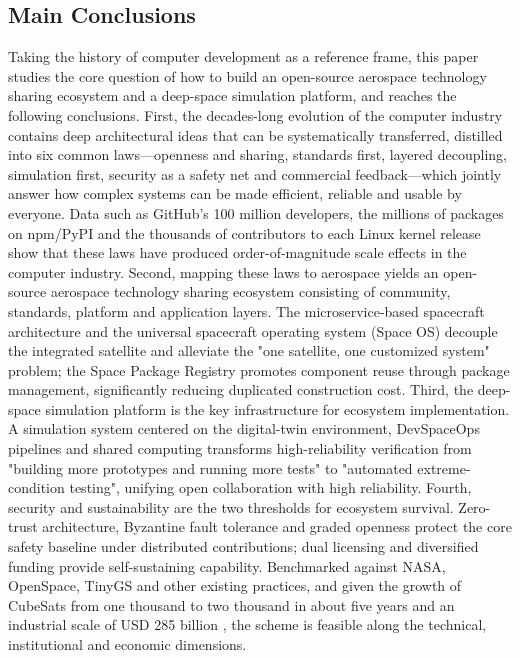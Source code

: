 \documentclass[11pt]{article}
\begin{document}
\subsection{Main Conclusions}
Taking the history of computer development as a reference frame, this paper studies the core question of how to build an open-source aerospace technology sharing ecosystem and a deep-space simulation platform, and reaches the following conclusions. First, the decades-long evolution of the computer industry contains deep architectural ideas that can be systematically transferred, distilled into six common laws---openness and sharing, standards first, layered decoupling, simulation first, security as a safety net and commercial feedback---which jointly answer how complex systems can be made efficient, reliable and usable by everyone. Data such as GitHub's 100 million developers, the millions of packages on npm/PyPI and the thousands of contributors to each Linux kernel release show that these laws have produced order-of-magnitude scale effects in the computer industry. Second, mapping these laws to aerospace yields an open-source aerospace technology sharing ecosystem consisting of community, standards, platform and application layers. The microservice-based spacecraft architecture and the universal spacecraft operating system (Space OS) decouple the integrated satellite and alleviate the "one satellite, one customized system" problem; the Space Package Registry promotes component reuse through package management, significantly reducing duplicated construction cost. Third, the deep-space simulation platform is the key infrastructure for ecosystem implementation. A simulation system centered on the digital-twin environment, DevSpaceOps pipelines and shared computing transforms high-reliability verification from "building more prototypes and running more tests" to "automated extreme-condition testing", unifying open collaboration with high reliability. Fourth, security and sustainability are the two thresholds for ecosystem survival. Zero-trust architecture, Byzantine fault tolerance and graded openness protect the core safety baseline under distributed contributions; dual licensing and diversified funding provide self-sustaining capability. Benchmarked against NASA, OpenSpace, TinyGS and other existing practices, and given the growth of CubeSats from one thousand to two thousand in about five years and an industrial scale of USD 285 billion \cite{kulu2024,sia2024}, the scheme is feasible along the technical, institutional and economic dimensions.
\end{document}
